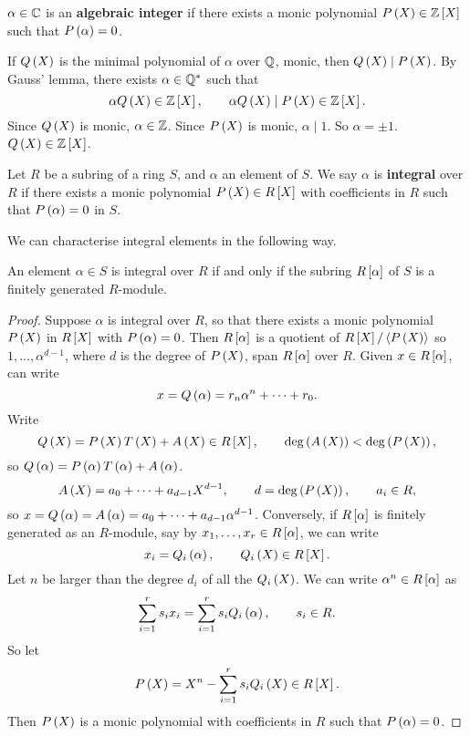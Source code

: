 \begin{definition}
$ \alpha \in \C $ is an \textbf{algebraic integer} if there exists a monic polynomial $ P\rb{X} \in \Z\sb{X} $ such that $ P\rb{\alpha} = 0 $.
\end{definition}

\begin{note*}
If $ Q\rb{X} $ is the minimal polynomial of $ \alpha $ over $ \Q $, monic, then $ Q\rb{X} \mid P\rb{X} $. By Gauss' lemma, there exists $ \alpha \in \Q^* $ such that
$$ \alpha Q\rb{X} \in \Z\sb{X}, \qquad \alpha Q\rb{X} \mid P\rb{X} \in \Z\sb{X}. $$
Since $ Q\rb{X} $ is monic, $ \alpha \in \Z $. Since $ P\rb{X} $ is monic, $ \alpha \mid 1 $. So $ \alpha = \pm 1 $. $ Q\rb{X} \in \Z\sb{X} $.
\end{note*}

\begin{definition}
Let $ R $ be a subring of a ring $ S $, and $ \alpha $ an element of $ S $. We say $ \alpha $ is \textbf{integral} over $ R $ if there exists a monic polynomial $ P\rb{X} \in R\sb{X} $ with coefficients in $ R $ such that $ P\rb{\alpha} = 0 $ in $ S $.
\end{definition}

We can characterise integral elements in the following way.

\begin{proposition}
An element $ \alpha \in S $ is integral over $ R $ if and only if the subring $ R\sb{\alpha} $ of $ S $ is a finitely generated $ R $-module.
\end{proposition}

\begin{proof}
Suppose $ \alpha $ is integral over $ R $, so that there exists a monic polynomial $ P\rb{X} $ in $ R\sb{X} $ with $ P\rb{\alpha} = 0 $. Then $ R\sb{\alpha} $ is a quotient of $ R\sb{X} / \ab{P\rb{X}} $ so $ 1, \dots, \alpha^{d - 1} $, where $ d $ is the degree of $ P\rb{X} $, span $ R\sb{\alpha} $ over $ R $. Given $ x \in R\sb{\alpha} $, can write
$$ x = Q\rb{\alpha} = r_n\alpha^n + \dots + r_0. $$
Write
$$ Q\rb{X} = P\rb{X}T\rb{X} + A\rb{X} \in R\sb{X}, \qquad \deg\rb{A\rb{X}} < \deg\rb{P\rb{X}}, $$
so $ Q\rb{\alpha} = P\rb{\alpha}T\rb{\alpha} + A\rb{\alpha} $.
$$ A\rb{X} = a_0 + \dots + a_{d - 1}X^{d - 1}, \qquad d = \deg\rb{P\rb{X}}, \qquad a_i \in R, $$
so $ x = Q\rb{\alpha} = A\rb{\alpha} = a_0 + \dots + a_{d - 1}\alpha^{d - 1} $. Conversely, if $ R\sb{\alpha} $ is finitely generated as an $ R $-module, say by $ x_1, \dots, x_r \in R\sb{\alpha} $, we can write
$$ x_i = Q_i\rb{\alpha}, \qquad Q_i\rb{X} \in R\sb{X}. $$
Let $ n $ be larger than the degree $ d_i $ of all the $ Q_i\rb{X} $. We can write $ \alpha^n \in R\sb{\alpha} $ as
$$ \sum_{i = 1}^r s_ix_i = \sum_{i = 1}^r s_iQ_i\rb{\alpha}, \qquad s_i \in R. $$
So let
$$ P\rb{X} = X^n - \sum_{i = 1}^r s_iQ_i\rb{X} \in R\sb{X}. $$
Then $ P\rb{X} $ is a monic polynomial with coefficients in $ R $ such that $ P\rb{\alpha} = 0 $.
\end{proof}

